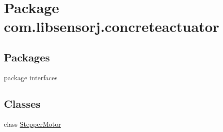 \hypertarget{namespacecom_1_1libsensorj_1_1concreteactuator}{}\section{Package com.\+libsensorj.\+concreteactuator}
\label{namespacecom_1_1libsensorj_1_1concreteactuator}
\subsection*{Packages}
\begin{DoxyCompactItemize}
\item 
package \hyperlink{namespacecom_1_1libsensorj_1_1concreteactuator_1_1interfaces}{interfaces}
\end{DoxyCompactItemize}
\subsection*{Classes}
\begin{DoxyCompactItemize}
\item 
class \hyperlink{classcom_1_1libsensorj_1_1concreteactuator_1_1StepperMotor}{Stepper\+Motor}
\end{DoxyCompactItemize}
